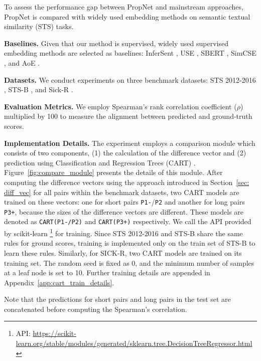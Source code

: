 To assess the performance gap between PropNet and mainstream approaches, PropNet is compared with widely used embedding methods on semantic textual similarity (STS) tasks. 

\textbf{Baselines.} Given that our method is supervised, widely used supervised embedding methods are selected as baselines: InferSent \citep{2017Supervised}, USE \citep{Cer2018UniversalSE}, SBERT \citep{Reimers2019SentenceBERTSE}, SimCSE \citep{Gao2021SimCSESC}, and AoE \citep{Li2024AoEAE}.

\textbf{Datasets.} We conduct experiments on three benchmark datasets: STS 2012-2016 \citep{Agirre2012SemEval2012T6, Agirre2013SEM2S, Agirre2014SemEval2014T1, Agirre2015SemEval2015T2, Agirre2016SemEval2016T1}, STS-B \citep{Cer2017SemEval2017T1}, and Sick-R \citep{Marelli2014ASC}.

\textbf{Evaluation Metrics.} We employ Spearman's rank correlation coefficient ($\rho$) multiplied by 100 to measure the alignment between predicted and ground-truth scores. 

\textbf{Implementation Details. } The experiment employs a comparison module which consists of two components, (1) the calculation of the difference vector and (2) prediction using Classification and Regression Trees (CART) \citep{Breiman1984ClassificationAR}. Figure~\ref{fig:compare_module} presents the details of this module. After computing the difference vectors using the approach introduced in Section~\ref{sec: diff_vec} for all pairs within the benchmark datasets, two CART models are trained on these vectors: one for short pairs \texttt{P1-}/\texttt{P2} and another for long pairs \texttt{P3+}, because the sizes of the difference vectors are different. These models are denoted as \texttt{CART(P1-/P2)} and \texttt{CART(P3+)} respectively. We call the API provided by scikit-learn \footnote{API: \url{https://scikit-learn.org/stable/modules/generated/sklearn.tree.DecisionTreeRegressor.html}} for training. Since STS 2012-2016 and STS-B share the same rules for ground scores, training is implemented only on the train set of STS-B to learn these rules. Similarly, for SICK-R, two CART models are trained on its training set. The random seed is fixed as 0, and the minimum number of samples at a leaf node is set to 10. Further training details are appended in Appendix~\ref{app:cart_train_details}.

Note that the predictions for short pairs and long pairs in the test set are concatenated before computing the Spearman's correlation.


